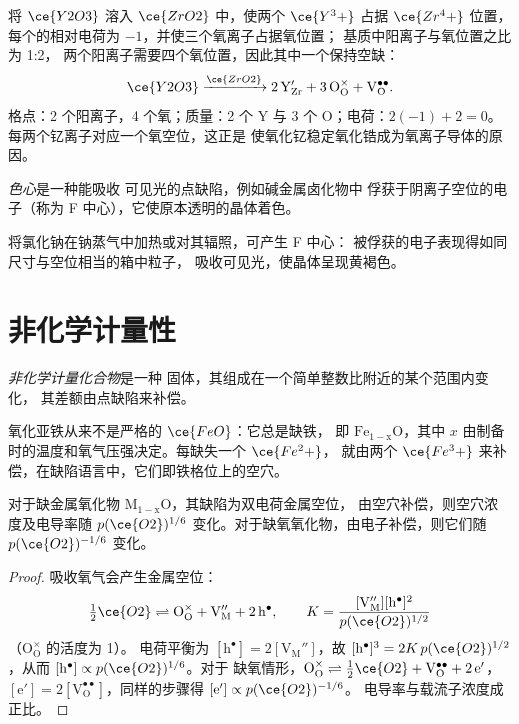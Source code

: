 \begin{example}[氧化钇在氧化锆中]
将 $\ce{Y2O3}$ 溶入 $\ce{ZrO2}$ 中，使两个 $\ce{Y^3+}$ 占据 $\ce{Zr^4+}$ 位置，每个的相对电荷为 $-1$，并使三个氧离子占据氧位置；
基质中阳离子与氧位置之比为 1:2，
两个阳离子需要四个氧位置，因此其中一个保持空缺：
\[
  \ce{Y2O3} \xrightarrow{\ce{ZrO2}} \mathrm{2\,Y_{Zr}' + 3\,O_O^{\times} + V_O^{\bullet\bullet}}.
\]
格点：2 个阳离子，4 个氧；质量：2 个 Y 与 3 个 O；电荷：$2(-1) + 2 = 0$。
每两个钇离子对应一个氧空位，这正是
使氧化钇稳定氧化锆成为氧离子导体的原因。
\end{example}

\begin{definition}[色心]\label{def:b3:solid-state:colour-centre}
\emph{色心}是一种能吸收
可见光的点缺陷，例如碱金属卤化物中
俘获于阴离子空位的电子（称为 F 中心），它使原本透明的晶体着色。
\end{definition}

将氯化钠在钠蒸气中加热或对其辐照，可产生 F 中心：
被俘获的电子表现得如同尺寸与空位相当的箱中粒子，
吸收可见光，使晶体呈现黄褐色。

\section{非化学计量性}

\begin{definition}[非化学计量化合物]\label{def:b3:solid-state:non-stoichiometric}
\emph{非化学计量化合物}是一种
固体，其组成在一个简单整数比附近的某个范围内变化，
其差额由点缺陷来补偿。
\end{definition}

氧化亚铁从来不是严格的 $\ce{FeO}$：它总是缺铁，
即 $\mathrm{Fe_{1-x}O}$，其中 $x$ 由制备时的温度和氧气压强决定。每缺失一个 $\ce{Fe^2+}$，
就由两个 $\ce{Fe^3+}$ 来补偿，在缺陷语言中，它们即铁格位上的空穴。

\begin{proposition}[电导率与氧气压强]\label{prop:b3:solid-state:brouwer}
对于缺金属氧化物 $\mathrm{M_{1-x}O}$，其缺陷为双电荷金属空位，
由空穴补偿，则空穴浓度及电导率随
$p(\ce{O2})^{1/6}$ 变化。对于缺氧氧化物，由电子补偿，则它们随
$p(\ce{O2})^{-1/6}$ 变化。
\end{proposition}

\begin{proof}
吸收氧气会产生金属空位：
\[
  \tfrac12\ce{O2} \rightleftharpoons \mathrm{O_O^{\times} + V_M'' + 2\,h^{\bullet}}, \qquad K = \frac{[\mathrm{V_M''}][\mathrm h^\bullet]^2}{p(\ce{O2})^{1/2}}
\]
（$\mathrm{O_O^{\times}}$ 的活度为 1）。
电荷平衡为 $[\mathrm h^\bullet] = 2[\mathrm{V_M''}]$，故 $[\mathrm h^\bullet]^3 = 2K\,p(\ce{O2})^{1/2}$，从而 $[\mathrm h^\bullet] \propto p(\ce{O2})^{1/6}$。对于
缺氧情形，$\mathrm{O_O^{\times}} \rightleftharpoons \tfrac12\ce{O2} + \mathrm{V_O^{\bullet\bullet} + 2\,e'}$，$[\mathrm e'] = 2[\mathrm{V_O^{\bullet\bullet}}]$，同样的步骤得 $[\mathrm e'] \propto p(\ce{O2})^{-1/6}$。
电导率与载流子浓度成正比。
\end{proof}

